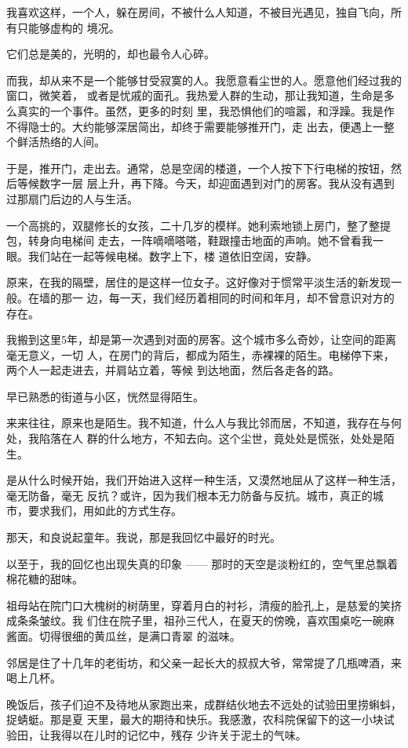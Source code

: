 \documentclass[12pt,a4paper]{article}
\begin{document}
		我喜欢这样，一个人，躲在房间，不被什么人知道，不被目光遇见，独自飞向，所有只能够虚构的
	境况。

		它们总是美的，光明的，却也最令人心碎。

		而我，却从来不是一个能够甘受寂寞的人。我愿意看尘世的人。愿意他们经过我的窗口，微笑着，
	或者是忧戚的面孔。我热爱人群的生动，那让我知道，生命是多么真实的一个事件。虽然，更多的时刻
	里，我恐惧他们的喧嚣，和浮躁。我是作不得隐士的。大约能够深居简出，却终于需要能够推开门，走
	出去，便遇上一整个鲜活热络的人间。

		于是，推开门，走出去。通常，总是空阔的楼道，一个人按下下行电梯的按钮，然后等候数字一层
	层上升，再下降。今天，却迎面遇到对门的房客。我从没有遇到过那扇门后边的人与生活。

		一个高挑的，双腿修长的女孩，二十几岁的模样。她利索地锁上房门，整了整提包，转身向电梯间
	走去，一阵嘀嘀嗒嗒，鞋跟撞击地面的声响。她不曾看我一眼。我们站在一起等候电梯。数字上下，楼
	道依旧空阔，安静。

		原来，在我的隔壁，居住的是这样一位女子。这好像对于惯常平淡生活的新发现一般。在墙的那一
	边，每一天，我们经历着相同的时间和年月，却不曾意识对方的存在。

		我搬到这里5年，却是第一次遇到对面的房客。这个城市多么奇妙，让空间的距离毫无意义，一切
	人，在房门的背后，都成为陌生，赤裸裸的陌生。电梯停下来，两个人一起走进去，并肩站立着，等候
	到达地面，然后各走各的路。

		早已熟悉的街道与小区，恍然显得陌生。

		来来往往，原来也是陌生。我不知道，什么人与我比邻而居，不知道，我存在与何处，我陷落在人
	群的什么地方，不知去向。这个尘世，竟处处是慌张，处处是陌生。

		是从什么时候开始，我们开始进入这样一种生活，又漠然地屈从了这样一种生活，毫无防备，毫无
	反抗？或许，因为我们根本无力防备与反抗。城市，真正的城市，要求我们，用如此的方式生存。

		那天，和良说起童年。我说，那是我回忆中最好的时光。

		以至于，我的回忆也出现失真的印象 —— 那时的天空是淡粉红的，空气里总飘着棉花糖的甜味。

		祖母站在院门口大槐树的树荫里，穿着月白的衬衫，清瘦的脸孔上，是慈爱的笑挤成条条皱纹。我
	们住在院子里，祖孙三代人，在夏天的傍晚，喜欢围桌吃一碗麻酱面。切得很细的黄瓜丝，是满口青翠
	的滋味。

		邻居是住了十几年的老街坊，和父亲一起长大的叔叔大爷，常常提了几瓶啤酒，来喝上几杯。

		晚饭后，孩子们迫不及待地从家跑出来，成群结伙地去不远处的试验田里捞蝌蚪，捉蜻蜓。那是夏
	天里，最大的期待和快乐。我感激，农科院保留下的这一小块试验田，让我得以在儿时的记忆中，残存
	少许关于泥土的气味。
\end{document}
